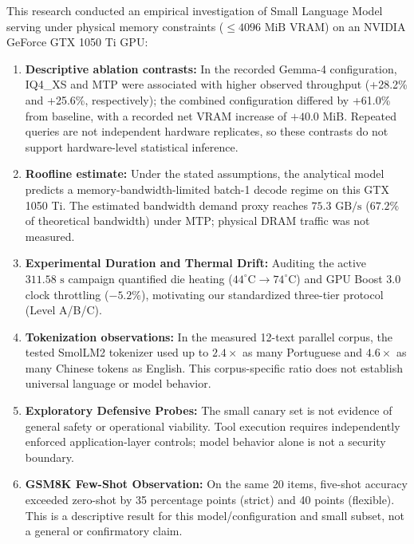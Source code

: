 \documentclass[10pt,a4paper,twocolumn]{article}
\begin{document}
This research conducted an empirical investigation of Small Language Model serving under physical memory constraints ($\le 4096\text{ MiB}$ VRAM) on an NVIDIA GeForce GTX 1050 Ti GPU:
\begin{enumerate}[leftmargin=1.5em,itemsep=0.2em]
    \item \textbf{Descriptive ablation contrasts:} In the recorded Gemma-4 configuration, IQ4\_XS and MTP were associated with higher observed throughput (+28.2\% and +25.6\%, respectively); the combined configuration differed by +61.0\% from baseline, with a recorded net VRAM increase of $+40.0\text{ MiB}$. Repeated queries are not independent hardware replicates, so these contrasts do not support hardware-level statistical inference.
    \item \textbf{Roofline estimate:} Under the stated assumptions, the analytical model predicts a memory-bandwidth-limited batch-1 decode regime on this GTX 1050 Ti. The estimated bandwidth demand proxy reaches $75.3\text{ GB/s}$ ($67.2\%$ of theoretical bandwidth) under MTP; physical DRAM traffic was not measured.
    \item \textbf{Experimental Duration and Thermal Drift:} Auditing the active $311.58\text{ s}$ campaign quantified die heating ($44^\circ\text{C} \to 74^\circ\text{C}$) and GPU Boost 3.0 clock throttling ($-5.2\%$), motivating our standardized three-tier protocol (Level A/B/C).
    \item \textbf{Tokenization observations:} In the measured 12-text parallel corpus, the tested SmolLM2 tokenizer used up to $2.4\times$ as many Portuguese and $4.6\times$ as many Chinese tokens as English. This corpus-specific ratio does not establish universal language or model behavior.
    \item \textbf{Exploratory Defensive Probes:} The small canary set is not evidence of general safety or operational viability. Tool execution requires independently enforced application-layer controls; model behavior alone is not a security boundary.
    \item \textbf{GSM8K Few-Shot Observation:} On the same 20 items, five-shot accuracy exceeded zero-shot by 35 percentage points (strict) and 40 points (flexible). This is a descriptive result for this model/configuration and small subset, not a general or confirmatory claim.
\end{enumerate}
\end{document}
